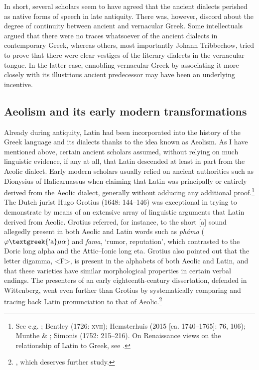 \documentclass[output=paper]{langsci/langscibook}
\begin{document}
In short, several scholars seem to have agreed that the ancient dialects perished as native forms of speech in late antiquity. There was, however, discord about the degree of continuity between ancient and vernacular Greek. Some intellectuals argued that there were no traces whatsoever of the ancient dialects in contemporary Greek, whereas others, most importantly Johann Tribbechow, tried to prove that there were clear vestiges of the literary dialects in the vernacular tongue. In the latter case, ennobling vernacular Greek by associating it more closely with its illustrious ancient predecessor may have been an underlying incentive.

\subsection{Aeolism and its early modern transformations}
\hypertarget{Toc19704840}{}
Already during antiquity, Latin had been incorporated into the history of the Greek language and its dialects thanks to the idea known as Aeolism. As I have mentioned above, certain ancient scholars assumed, without relying on much linguistic evidence, if any at all, that Latin descended at least in part from the Aeolic dialect. Early modern scholars usually relied on ancient authorities such as Dionysius of Halicarnassus when claiming that Latin was principally or entirely derived from the Aeolic dialect, generally without adducing any additional proof.\footnote{See e.g. \citet[84]{Crinesius1629}; Bentley (1726: \textsc{xvii}); Hemsterhuis (2015 [ca. 1740–1765]: 76, 106); Munthe \& \citet[30]{Heiberg1748}; Simonis (1752: 215–216). On Renaissance views on the relationship of Latin to Greek, see \citet{Tavoni1986}.} The Dutch jurist Hugo Grotius (1648: 144–146) was exceptional in trying to demonstrate by means of an extensive array of linguistic arguments that Latin derived from Aeolic. Grotius referred, for instance, to the short [a] sound allegedly present in both Aeolic and Latin words such as \textit{pháma} ($\varphi \text{\textgreek{'a}}\mu \alpha $) and \textit{fama}, ‘rumor, reputation’, which contrasted to the Doric long alpha and the Attic–Ionic long eta. Grotius also pointed out that the letter digamma, <F>, is present in the alphabets of both Aeolic and Latin, and that these varieties have similar morphological properties in certain verbal endings. The presenters of an early eighteenth-century dissertation, defended in Wittenberg, went even further than Grotius by systematically comparing and tracing back Latin pronunciation to that of Aeolic.\footnote{\citet{ThryllitschBrunner1709}, which deserves further study.}
\end{document}
